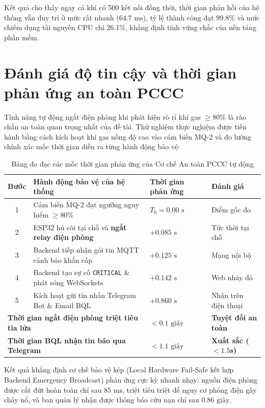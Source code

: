 Kết quả cho thấy ngay cả khi có 500 kết nối đồng thời, thời gian phản hồi của hệ thống vẫn duy trì ở mức rất nhanh ($64.7\text{ ms}$), tỷ lệ thành công đạt 99.8\% và mức chiếm dụng tài nguyên CPU chỉ 26.1\%, khẳng định tính vững chắc của nền tảng phần mềm.

\section{Đánh giá độ tin cậy và thời gian phản ứng an toàn PCCC}
\label{sec:danh_gia_pccc}

Tính năng tự động ngắt điện phòng khi phát hiện rò rỉ khí gas $\ge 80\%$ là rào chắn an toàn quan trọng nhất của đề tài. Thử nghiệm thực nghiệm được tiến hành bằng cách kích hoạt khí gas nồng độ cao vào cảm biến MQ-2 và đo lường chính xác mốc thời gian diễn ra từng hành động bảo vệ:

\begin{table}[H]
\centering
\footnotesize
\begin{tabularx}{\textwidth}{|c|X|p{2.5cm}|p{2.5cm}|}
\hline
\textbf{Bước} & \textbf{Hành động bảo vệ của hệ thống} & \textbf{Thời gian phản ứng} & \textbf{Đánh giá} \\
\hline
1 & Cảm biến MQ-2 đạt ngưỡng nguy hiểm $\ge 80\%$ & $T_0 = 0.00\text{ s}$ & Điểm gốc đo \\
\hline
2 & ESP32 hú còi tại chỗ và \textbf{ngắt relay điện phòng} & $+0.085\text{ s}$ & Tức thời tại chỗ \\
\hline
3 & Backend tiếp nhận gói tin MQTT cảnh báo khẩn cấp & $+0.125\text{ s}$ & Mạng nội bộ \\
\hline
4 & Backend tạo sự cố \texttt{CRITICAL} \& phát sóng WebSockets & $+0.142\text{ s}$ & Web nháy đỏ \\
\hline
5 & Kích hoạt gửi tin nhắn Telegram Bot \& Email BQL & $+0.860\text{ s}$ & Nhận trên điện thoại \\
\hline
\multicolumn{2}{|l|}{\textbf{Thời gian ngắt điện phòng triệt tiêu tia lửa}} & \textbf{$< 0.1\text{ giây}$} & \textbf{Tuyệt đối an toàn} \\
\hline
\multicolumn{2}{|l|}{\textbf{Thời gian BQL nhận tin báo qua Telegram}} & \textbf{$< 1.1\text{ giây}$} & \textbf{Xuất sắc ($< 1.5$s)} \\
\hline
\end{tabularx}
\caption{Bảng đo đạc các mốc thời gian phản ứng của Cơ chế An toàn PCCC tự động}
\label{tab:thoi_gian_phan_ung_pccc}
\end{table}

Kết quả khẳng định cơ chế bảo vệ kép (Local Hardware Fail-Safe kết hợp Backend Emergency Broadcast) phản ứng cực kỳ nhanh nhạy: nguồn điện phòng được cắt đứt hoàn toàn chỉ sau $85\text{ ms}$, triệt tiêu triệt để nguy cơ phóng điện gây cháy nổ, và ban quản lý nhận được thông báo cứu nạn chỉ sau $0.86\text{ giây}$.

\newpage
